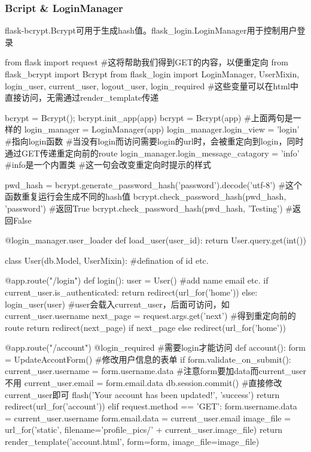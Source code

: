     \subsubsection{Bcript \& LoginManager}
      flask-bcrypt.Bcrypt可用于生成hash值。flask\_login.LoginManager用于控制用户登录
      \begin{codeblock}[language=python, caption={Using Bcript in app.py}]
        from flask import request #这将帮助我们得到GET的内容，以便重定向
        from flask_bcrypt import Bcrypt
        from flask_login import LoginManager, UserMixin, login_user, 
                                current_user, logout_user, login_required
            #这些变量可以在html中直接访问，无需通过render\_template传递

        bcrypt = Bcrypt(); bcrypt.init_app(app)
        bcrypt = Bcrypt(app) #上面两句是一样的
        login_manager = LoginManager(app)
        login_manager.login_view = 'login' #指向login函数
        #当没有login而访问需要login的url时，会被重定向到login，同时通过GET传递重定向前的route
        login_manager.login_message_catagory = 'info' #info是一个内置类
        #这一句会改变重定向时提示的样式

        pwd_hash = bcrypt.generate_password_hash('password').decode('utf-8') 
            #这个函数重复运行会生成不同的hash值
        bcrypt.check_password_hash(pwd_hash, 'password') #返回True
        bcrypt.check_password_hash(pwd_hash, 'Testing') #返回False

        @login_manager.user_loader
        def load_user(user_id):
            return User.query.get(int())

        class User(db.Model, UserMixin):
            #defination of id etc.

        @app.route("/login")
        def login():
          user = User() #add name email etc.  
          if current_user.is_authenticated:
              return redirect(url_for('home'))
          else:
              login_user(user) #user会载入current\_user，后面可访问，如current\_user.username
              next_page = request.args.get('next') #得到重定向前的route
              return redirect(next_page) if next_page else redirect(url_for('home'))

        @app.route("/account")
        @login_required #需要login才能访问
        def account():
            form = UpdateAccontForm() #修改用户信息的表单
            if form.validate_on_submit():
                current_user.username = form.username.data #注意form要加data而current\_user不用
                current_user.email = form.email.data
                db.session.commit() #直接修改current\_user即可
                flash('Your account has been updated!', 'success')
                return redirect(url_for('account'))
            elif request.method == 'GET':
                form.username.data = current_user.username
                form.email.data = current_user.email
            image_file = url_for('static', filename='profile_pics/' + current_user.image_file)
            return render_template('account.html', form=form, image_file=image_file)
      \end{codeblock}

